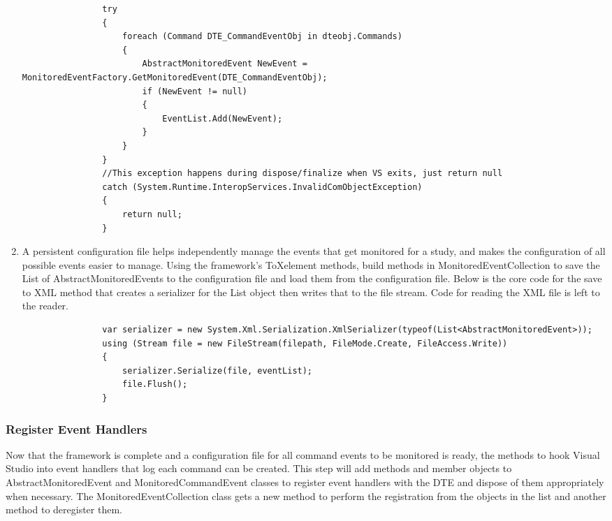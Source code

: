 \begin{enumerate}
\begin{lstlisting}
                try
                {
                    foreach (Command DTE_CommandEventObj in dteobj.Commands)
                    {
                        AbstractMonitoredEvent NewEvent = MonitoredEventFactory.GetMonitoredEvent(DTE_CommandEventObj);
                        if (NewEvent != null)
                        {
                            EventList.Add(NewEvent);
                        }
                    }
                }
                //This exception happens during dispose/finalize when VS exits, just return null
                catch (System.Runtime.InteropServices.InvalidComObjectException)
                {
                    return null;
                }
\end{lstlisting}

\item
A persistent configuration file helps independently manage the events that get monitored for a study, and makes the configuration of all possible events easier to manage.    Using the framework's ToXelement methods, build methods in MonitoredEventCollection to save the List of AbstractMonitoredEvents to the configuration file and load them from the configuration file.  Below is the core code for the save to XML method that creates a serializer for the List object then writes that to the file stream.  Code for reading the XML file is left to the reader.

\begin{lstlisting}
                var serializer = new System.Xml.Serialization.XmlSerializer(typeof(List<AbstractMonitoredEvent>));
                using (Stream file = new FileStream(filepath, FileMode.Create, FileAccess.Write))
                {
                    serializer.Serialize(file, eventList);
                    file.Flush();
                }
\end{lstlisting}

\end{enumerate}


\newpage



\subsubsection{Register Event Handlers}

Now that the framework is complete and a configuration file for all command events to be monitored is ready, the methods to hook Visual Studio into event handlers that log each command can be created.  This step will add methods and member objects to AbstractMonitoredEvent and MonitoredCommandEvent classes to register event handlers with the DTE and dispose of them appropriately when necessary.  The MonitoredEventCollection class gets a new method to perform the registration from the objects in the list and another method to deregister them.

